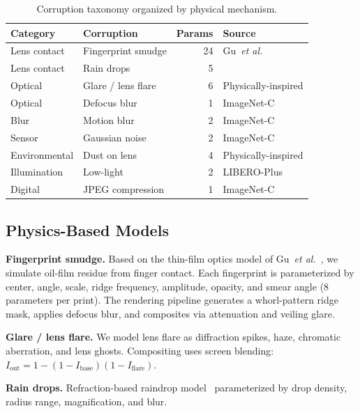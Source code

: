 \documentclass[letterpaper]{IEEEtran}
\newcommand{\etal}{\textit{et al.}}
\begin{document}
\begin{table}[t]
\centering
\caption{Corruption taxonomy organized by physical mechanism.}
\label{tab:corruptions}
\footnotesize
\begin{tabular}{llrl}
\toprule
\textbf{Category} & \textbf{Corruption} & \textbf{Params} & \textbf{Source} \\
\midrule
Lens contact  & Fingerprint smudge & 24 & Gu~\etal~\cite{gu2009} \\
Lens contact  & Rain drops         &  5 & \cite{camera_occlusion} \\
Optical       & Glare / lens flare &  6 & Physically-inspired \\
Optical       & Defocus blur       &  1 & ImageNet-C~\cite{hendrycks2019} \\
Blur          & Motion blur        &  2 & ImageNet-C~\cite{hendrycks2019} \\
Sensor        & Gaussian noise     &  2 & ImageNet-C~\cite{hendrycks2019} \\
Environmental & Dust on lens       &  4 & Physically-inspired \\
Illumination  & Low-light          &  2 & LIBERO-Plus~\cite{liberoplus} \\
Digital       & JPEG compression   &  1 & ImageNet-C~\cite{hendrycks2019} \\
\bottomrule
\end{tabular}
\end{table}

\subsection{Physics-Based Models}

\noindent\textbf{Fingerprint smudge.}
Based on the thin-film optics model of Gu~\etal~\cite{gu2009}, we simulate oil-film residue from finger contact.
Each fingerprint is parameterized by center, angle, scale, ridge frequency, amplitude, opacity, and smear angle (8 parameters per print).
The rendering pipeline generates a whorl-pattern ridge mask, applies defocus blur, and composites via attenuation and veiling glare.

\noindent\textbf{Glare / lens flare.}
We model lens flare as diffraction spikes, haze, chromatic aberration, and lens ghosts.
Compositing uses screen blending: $I_{\text{out}} = 1 - (1 - I_{\text{base}})(1 - I_{\text{flare}})$.

\noindent\textbf{Rain drops.}
Refraction-based raindrop model~\cite{camera_occlusion} parameterized by drop density, radius range, magnification, and blur.
\end{document}
